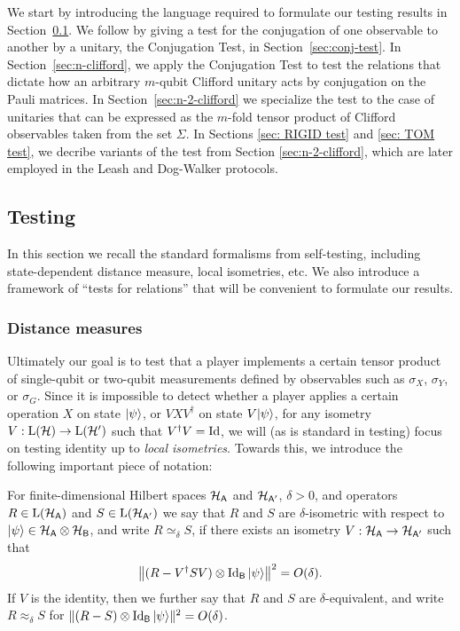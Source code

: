 We start by introducing the language required to formulate our testing results in Section~\ref{sec:general-rigidity}. 
We follow by giving a test for the conjugation of one observable to another by a unitary, the Conjugation Test, in Section~\ref{sec:conj-test}.
In Section~\ref{sec:n-clifford}, we apply the Conjugation Test  to test the
relations that dictate how an arbitrary $m$-qubit Clifford unitary acts by
conjugation on the Pauli matrices. In Section~\ref{sec:n-2-clifford} we
specialize the test to the case of unitaries that can be expressed as the
$m$-fold tensor product of Clifford observables taken from the set $\Sigma$. In
Sections \ref{sec: RIGID test} and \ref{sec: TOM test}, we decribe variants of
the test from Section \ref{sec:n-2-clifford}, which are later employed in the
Leash and Dog-Walker protocols.


\subsection{Testing}
\label{sec:general-rigidity}

In this section we recall the standard formalisms from self-testing, including state-dependent distance measure, local isometries, etc. We also introduce a framework of ``tests for relations'' that will be convenient to formulate our results. 


\subsubsection{Distance measures}

Ultimately our goal is to test that a player implements a certain tensor product of single-qubit or two-qubit measurements defined by observables such as $\sigma_X$, $\sigma_Y$, or $\sigma_G$. Since it is impossible to detect whether a player applies a certain operation $X$ on state $|\psi\rangle$, or $VXV^\dagger$ on state $V|\psi\rangle$, for any isometry $V:\mathrm{L}(\mathcal{H})\to\mathrm{L}(\mathcal{H}')$ such that $V^\dagger V = \mathop{\rm Id}\nolimits$, we will (as is standard in testing) focus on testing identity up to \emph{local isometries}. Towards this, we introduce the following important piece of notation: 

\begin{definition}
For finite-dimensional Hilbert spaces $\mathcal{H}_{{\textsf{A}}}$ and $\mathcal{H}_{{\textsf{A}}'}$, $\delta>0$, and operators $R \in\mathrm{L}(\mathcal{H}_{{\textsf{A}}})$ and $S\in\mathrm{L}(\mathcal{H}_{{\textsf{A}}'})$ we say that $R$ and $S$ are $\delta$-isometric with respect to $|\psi\rangle \in \mathcal{H}_{{\textsf{A}}} \otimes \mathcal{H}_{{\textsf{B}}}$, and write $R\simeq_\delta S$, if there exists an isometry $V:\mathcal{H}_{{\textsf{A}}}\to\mathcal{H}_{{\textsf{A}}'}$ such that 
$$\big\|( R-V^\dagger SV)\otimes \mathop{\rm Id}\nolimits_{{\textsf{B}}} |\psi\rangle\big\|^2=O(\delta).$$
If $V$ is the identity, then we further say that $R$ and $S$ are $\delta$-equivalent, and write $R\approx_\delta S$ for $\| ( R- S) \otimes \mathop{\rm Id}\nolimits_{{\textsf{B}}} |\psi\rangle\|^2=O(\delta)$.
\end{definition}

